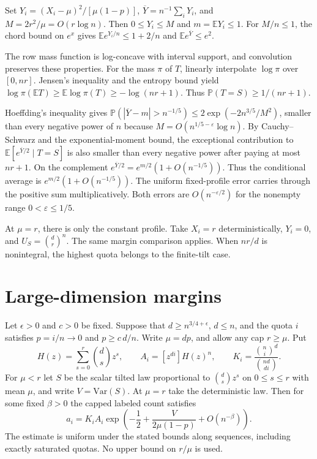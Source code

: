 \documentclass[11pt]{article}
\begin{document}
Set $Y_i=(X_i-\mu)^2/[\mu(1-p)]$, $\overline Y=n^{-1}\sum_iY_i$, and $M=2r^2/\mu=O(r\log n)$. Then $0\le Y_i\le M$ and $m=\mathbb EY_i\le1$. For $M/n\le1$, the chord bound on $e^x$ gives $\mathbb E e^{Y_i/n}\le1+2/n$ and $\mathbb E e^{\overline Y}\le e^2$.

The row mass function is log-concave with interval support, and convolution preserves these properties. For the mass $\pi$ of $T$, linearly interpolate $\log\pi$ over $[0,nr]$. Jensen's inequality and the entropy bound yield $\log\pi(\mathbb ET)\ge\mathbb E\log\pi(T)\ge-\log(nr+1)$. Thus $\mathbb P(T=S)\ge1/(nr+1)$.

Hoeffding's inequality gives $\mathbb P(|\overline Y-m|>n^{-1/5})\le2\exp(-2n^{3/5}/M^2)$, smaller than every negative power of $n$ because $M=O(n^{1/5-\varepsilon}\log n)$. By Cauchy--Schwarz and the exponential-moment bound, the exceptional contribution to $\mathbb E[e^{\overline Y/2}\mid T=S]$ is also smaller than every negative power after paying at most $nr+1$. On the complement $e^{\overline Y/2}=e^{m/2}(1+O(n^{-1/5}))$. Thus the conditional average is $e^{m/2}(1+O(n^{-1/5}))$. The uniform fixed-profile error carries through the positive sum multiplicatively. Both errors are $O(n^{-\varepsilon/2})$ for the nonempty range $0<\varepsilon\le1/5$.

At $\mu=r$, there is only the constant profile. Take $X_i=r$ deterministically, $Y_i=0$, and $U_S=\binom dr^n$. The same margin comparison applies. When $nr/d$ is nonintegral, the highest quota belongs to the finite-tilt case.

\section{Large-dimension margins}
\label{app:lw}

Let $\epsilon>0$ and $c>0$ be fixed. Suppose that
$d\ge n^{3/4+\epsilon}$, $d\le n$, and the quota $i$ satisfies
$p=i/n\to0$ and $p\ge c\,d/n$. Write $\mu=dp$, and allow any cap
$r\ge\mu$. Put
\[
H(z)=\sum_{s=0}^r\binom ds z^s,\qquad
A_i=[z^{di}]H(z)^n,\qquad
K_i=\frac{\binom ni^d}{\binom{nd}{di}}.
\]
For $\mu<r$ let $S$ be the scalar tilted law proportional to
$\binom ds z^s$ on $0\le s\le r$ with mean $\mu$, and write
$V=\mathrm{Var}(S)$. At $\mu=r$ take the deterministic law. Then
for some fixed $\beta>0$ the capped labeled count satisfies
\[
a_i=K_i A_i\exp\left(-\frac12+\frac{V}{2\mu(1-p)}
+O(n^{-\beta})\right).
\tag{1}
\]
The estimate is uniform under the stated bounds along sequences,
including exactly saturated quotas. No upper bound on $r/\mu$
is used.
\end{document}
